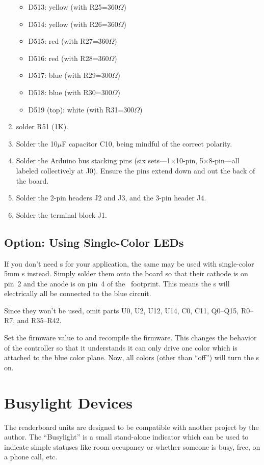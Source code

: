 \begin{enumerate}
\begin{itemize}
			\item D513: yellow (with R25=360$\Omega$)
			\item D514: yellow (with R26=360$\Omega$)
			\item D515: red (with R27=360$\Omega$)
			\item D516: red (with R28=360$\Omega$)
			\item D517: blue (with R29=300$\Omega$)
			\item D518: blue (with R30=300$\Omega$)
			\item D519 (top): white (with R31=300$\Omega$)
		\end{itemize}
	\item {} solder R51 (1K).
	\item {} Solder the 10$\mu$F capacitor C10, being mindful of the correct polarity. 
	\item Solder the Arduino bus stacking pins (six sets---1$\times$10-pin, 5$\times$8-pin---all labeled collectively at J0).
		Ensure the pins extend down and out the back of the board.
	\item Solder the 2-pin headers J2 and J3, and the 3-pin header J4.
	\item Solder the terminal block J1.
\end{enumerate}


\subsection{Option: Using Single-Color LEDs}
If you don't need  \led s for your application, the same 
may be used with single-color 5mm \led s instead. Simply solder them onto the board so
that their cathode is on pin~2 and the anode is on pin~4 of the \led\ footprint. This
means the \led s will electrically all be connected to the blue circuit. 

Since they won't be used, omit parts U0, U2, U12, U14, C0, C11, Q0--Q15, R0--R7, and R35--R42.

Set the firmware value  to  and recompile the firmware. This
changes the behavior of the controller so that it understands it can only drive one color which
is attached to the blue color plane. Now, all colors (other than ``off'') will turn the \led s
on.

\section{Busylight Devices}
The readerboard units are designed to be compatible with another project by the author. The ``Busylight''
is a small stand-alone indicator which can be used to indicate simple statuses like room occupancy or
whether someone is busy, free, on a phone call, etc.


